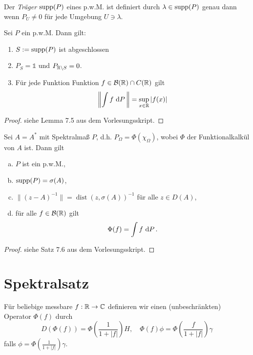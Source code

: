 \documentclass{mycourse}
\newcommand{\dist}{\operatorname{dist}}
\begin{document}
Der \emph{Träger} $\supp(P)$ eines p.w.M. ist definiert durch $\lambda \in \supp(P)$ genau dann wenn
$P_U\neq 0$ für jede Umgebung $U\ni \lambda$.
\begin{st}
Sei $P$ ein p.w.M. Dann gilt:
\begin{enumerate}
\item $S:= \supp(P)$ ist abgeschlossen
\item $P_S= \mathbb{1}$ und  $P_{\R \setminus S} =0$.
\item Für jede Funktion Funktion $f\in \mathcal B(\R) \cap C(\R)$ gilt
\[
\left \| \int f\, \dx[P]\right \| = \sup_{x\in \R} |f(x)|
\]
\end{enumerate}
\end{st}
\begin{proof}
siehe Lemma 7.5 aus dem Vorlesungsskript.
\end{proof}
\begin{st}
Sei $A=A^*$ mit Spektralmaß $P$, d.h. $P_\Omega= \Phi(\chi_\Omega)$, wobei $\Phi $ der Funktionalkalkül von $A$ ist. Dann gilt
\begin{enumerate}[a)]
\item $P$ ist ein p.w.M.,
\item $\supp(P) = \sigma(A)$,
\item $\| (z-A)^{-1} \| = \dist(z, \sigma(A))^{-1}$ für alle $z\in D(A)$,
\item für alle $f\in \mathcal B(\R)$ gilt
\[
\Phi(f) = \int f \, \dx[P].
\]

\end{enumerate}
\end{st}
\begin{proof}
siehe Satz 7.6 aus dem Vorlesungsskript.
\end{proof}

\section{Spektralsatz}
Für beliebige messbare $f: \R \to \C$ definieren wir einen (unbeschränkten) Operator $\Phi(f)$ durch
\begin{equation}\label{6.1}
D(\Phi(f))= \Phi(\frac{1}{1+|f|}) H, \quad \Phi(f) \phi = \Phi(\frac{f}{1+|f|}) \gamma
\end{equation}
falls $\phi = \Phi(\frac{1}{1+|f|}) \gamma$.
\end{document}
